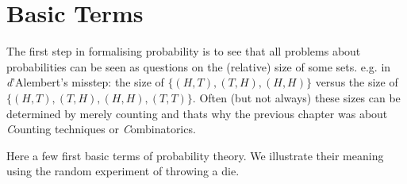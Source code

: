 \documentclass[twoside,11pt,a4paper]{article}
\newif\ifEN \ENtrue	                %
\def\tr|#1|#2|{\ifEN #2\else #1\fi}     %
\def\vsp{\vspace{5mm}}
\theoremstyle{definition}
\def\aside#1{\marginpar{\scriptsize #1}}
\begin{document}
\section{\tr|Grundlagen|Basic Terms|}
\tr|Der erste Schritt zu einer mathematischen Theorie der Wahrscheinlichkeit ist die Einsicht, das Fragen zur Wahrscheinlichkeit immer Fragen 
    zur \emph{relativen Grösse von Mengen} sind. Z.B. geht es in \emph{D'Alemberts Fehler} um die Gr"osse der Menge
    $$\{(K,Z), (Z,K), (K,K)\}$$ 
    im Verh"altnis zur Gr"osse der Menge 
    $$\{(K,Z), (Z,K), (K,K), (Z,Z)\}$$  
    Oft (aber nicht immer) kann die Gr"osse einer 
    Menge ganz einfach durch Z"ahlen bestimmt werden und deshalb haben wir uns im Kapitel 'Kombinatork' mit Z"ahltechniken besch"aftigt. 
   |The first step 
    in formalising probability is to see that all problems about probabilities can be seen as questions on the (relative) size of some sets.  
    e.g. in \emph{d'Alembert's misstep:} the size of $\{(H,T), (T,H), (H,H)\}$ versus the size of $\{(H,T), (T,H), (H,H), (T,T)\}$. 
    Often (but not always) these sizes can be determined by merely counting and thats why the previous chapter was about \emph{Counting techniques} or \emph{Combinatorics}.|
\par\bigskip\bigskip
\tr|Um Wahrscheinlichkeitsprobleme in Mengen übersetzen zu können, brauchen wir zuerst einen geeigneten Jargon: 
    In der folgenden Tabelle werden diese Grundbegriffe definiert und jeweils am Beispiel eines Würfels illustriert. 
   |Here a few first basic terms of probability theory. We illustrate their meaning using the random experiment of throwing a die. |
\vsp
\end{document}
